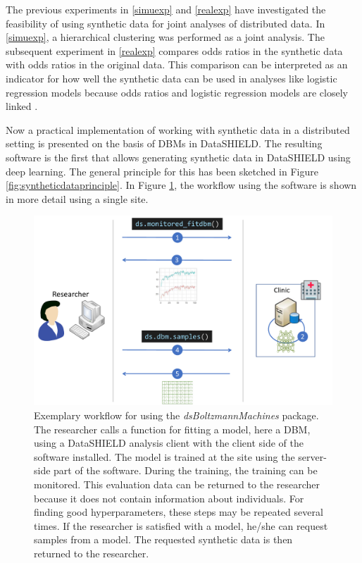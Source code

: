 \documentclass[12pt]{article}
\newcommand{\apkg}[1]{\emph{#1}}
\newcommand{\circlenum}[1]{\raisebox{.5pt}{\textcircled{\raisebox{-.9pt} {#1}}}}
\begin{document}
The previous experiments in \ref{simuexp} and \ref{realexp} have investigated the feasibility of using synthetic data for joint analyses of distributed data.
In \ref{simuexp}, a hierarchical clustering was performed as a joint analysis.
The subsequent experiment in \ref{realexp} compares odds ratios in the synthetic data with odds ratios in the original data.
This comparison can be interpreted as an indicator for how well the synthetic data can be used in analyses like logistic regression models because odds ratios and logistic regression models are closely linked \citep{blandaltmannodds}.

Now a practical implementation of working with synthetic data in a distributed setting is presented on the basis of DBMs in DataSHIELD.
The resulting software is the first that allows generating synthetic data in DataSHIELD using deep learning.
The general principle for this has been sketched in Figure \ref{fig:syntheticdataprinciple}.
In Figure \ref{fig:examplaryworkflow}, the workflow using the software is shown in more detail using a single site.

\begin{figure}[h]
   \centering
   \includegraphics[scale=0.5]{images/dsBoltzmannWorkflow.pdf}
   \caption{Exemplary workflow for using the \apkg{dsBoltzmannMachines} package.
   \circlenum{1} The researcher calls a function for fitting a model, here a DBM, using a DataSHIELD analysis client with the client side of the software installed.
   \circlenum{2} The model is trained at the site using the server-side part of the software. During the training, the training can be monitored.
   \circlenum{3} This evaluation data can be returned to the researcher because it does not contain information about individuals.
   For finding good hyperparameters, these steps may be repeated several times.
   \circlenum{4} If the researcher is satisfied with a model, he/she can request samples from a model.
   \circlenum{5} The requested synthetic data is then returned to the researcher.}
   \label{fig:examplaryworkflow}
 \end{figure}
\end{document}
